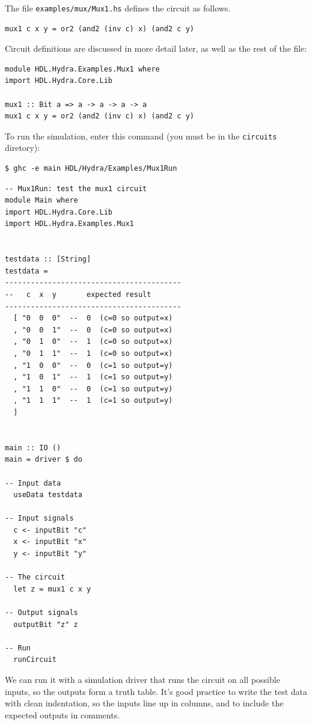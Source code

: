 \documentclass[]{svmono}
\begin{document}
The file \texttt{examples/mux/Mux1.hs} defines the circuit as follows.

\begin{verbatim}
mux1 c x y = or2 (and2 (inv c) x) (and2 c y)
\end{verbatim}

Circuit definitions are discussed in more detail later, as well as the
rest of the file:

\begin{verbatim}
module HDL.Hydra.Examples.Mux1 where
import HDL.Hydra.Core.Lib

mux1 :: Bit a => a -> a -> a -> a
mux1 c x y = or2 (and2 (inv c) x) (and2 c y)
\end{verbatim}


To run the simulation, enter this command (you must be in the
\texttt{circuits} diretory):
\begin{verbatim}
$ ghc -e main HDL/Hydra/Examples/Mux1Run
\end{verbatim}

\begin{verbatim}
-- Mux1Run: test the mux1 circuit
module Main where
import HDL.Hydra.Core.Lib
import HDL.Hydra.Examples.Mux1


testdata :: [String]
testdata =
-----------------------------------------
--   c  x  y       expected result
-----------------------------------------
  [ "0  0  0"  --  0  (c=0 so output=x)
  , "0  0  1"  --  0  (c=0 so output=x)
  , "0  1  0"  --  1  (c=0 so output=x)
  , "0  1  1"  --  1  (c=0 so output=x)
  , "1  0  0"  --  0  (c=1 so output=y)
  , "1  0  1"  --  1  (c=1 so output=y)
  , "1  1  0"  --  0  (c=1 so output=y)
  , "1  1  1"  --  1  (c=1 so output=y)
  ]


main :: IO ()
main = driver $ do

-- Input data
  useData testdata

-- Input signals  
  c <- inputBit "c"
  x <- inputBit "x"
  y <- inputBit "y"

-- The circuit
  let z = mux1 c x y

-- Output signals
  outputBit "z" z

-- Run
  runCircuit
\end{verbatim}



We can run it with a simulation driver that runs the circuit on all
possible inputs, so the outputs form a truth table.  It's good
practice to write the test data with clean indentation, so the inputs
line up in columns, and to include the expected outputs in comments.
\end{document}
